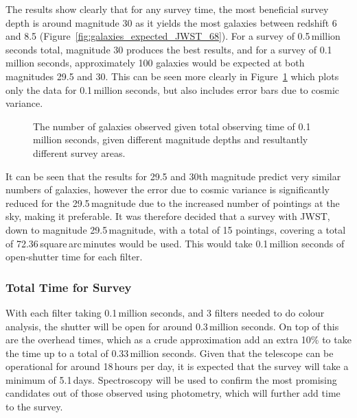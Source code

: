 		The results show clearly that for any survey time, the most beneficial survey depth is around magnitude 30 as it yields the most galaxies between redshift 6 and 8.5 (Figure~\ref{fig:galaxies_expected_JWST_68}). For a survey of 0.5\,million seconds total, magnitude 30 produces the best results, and for a survey of 0.1\,million seconds, approximately 100 galaxies would be expected at both magnitudes 29.5 and 30. This can be seen more clearly in Figure~\ref{fig:galaxies_expected_JWST_errors} which plots only the data for 0.1\,million seconds, but also includes error bars due to cosmic variance.
		\begin{figure}[htbp]
			\centering
				\begingroup{}
					\resizebox{0.8\textwidth}{!}{%
						
					}\endgroup
			\caption{The number of galaxies observed given total observing time of 0.1\,million seconds, given different magnitude depths and resultantly different survey areas.\label{fig:galaxies_expected_JWST_errors}}
		\end{figure}

		It can be seen that the results for 29.5 and 30th magnitude predict very similar numbers of galaxies, however the error due to cosmic variance is significantly reduced for the 29.5\,magnitude due to the increased number of pointings at the sky, making it preferable. It was therefore decided that a survey with JWST, down to magnitude 29.5\,magnitude, with a total of 15 pointings, covering a total of 72.36\,square\,arc\,minutes would be used. This would take 0.1\,million seconds of open-shutter time for each filter.

	\subsubsection{Total Time for Survey} %
	\label{sub:total_time_for_survey}
		With each filter taking 0.1\,million seconds, and 3 filters needed to do colour analysis, the shutter will be open for around 0.3\,million seconds. On top of this are the overhead times, which as a crude approximation add an extra 10\% to take the time up to a total of 0.33\,million seconds. Given that the telescope can be operational for around 18\,hours per day, it is expected that the survey will take a minimum of 5.1\,days. Spectroscopy will be used to confirm the most promising candidates out of those observed using photometry, which will further add time to the survey.

